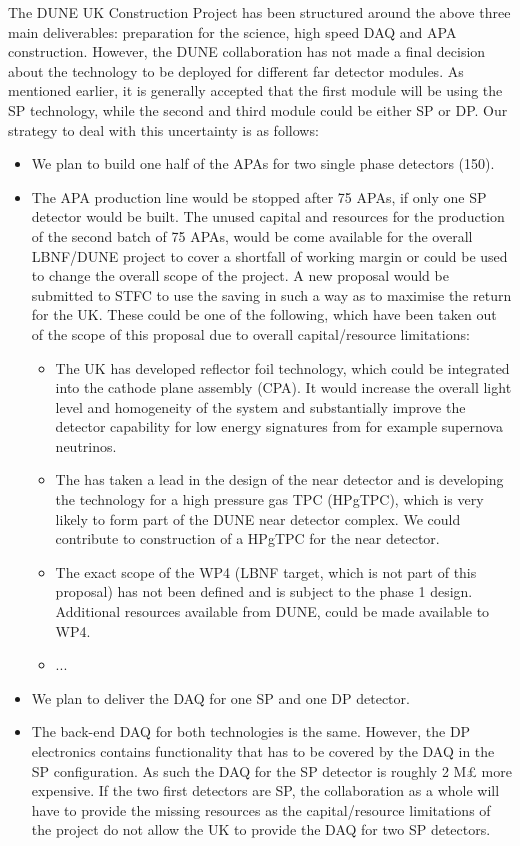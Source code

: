 The DUNE UK Construction Project has been structured around the above three main deliverables: preparation for the science, high speed DAQ and APA construction. However, the DUNE collaboration has not made a final decision about the technology to be deployed for different far detector modules. As mentioned earlier, it is generally accepted that the first module will be using the SP technology, while the second and third module could be either SP or DP. Our strategy to deal with this uncertainty is as follows:
\begin{itemize}
    \item We plan to build one half of the APAs for two single phase detectors (150). 
    \item The APA production line would be stopped after 75 APAs, if only one SP detector would be built. The unused capital and resources for the production of the second batch of 75 APAs,
    would be come available for the overall LBNF/DUNE project to cover a shortfall of working margin or could be used to change the overall scope of the project. A new proposal would be submitted to STFC to use the saving in such a way as to maximise the return for the UK. These could be one of the following, which have been taken out of the scope of this proposal due to overall capital/resource limitations:
    \begin{itemize}
        \item The UK has developed reflector foil technology, which could be integrated into the cathode plane assembly (CPA). It would increase the overall light level and homogeneity of the system and substantially improve the detector capability for low energy signatures from for example supernova neutrinos.
        \item The has taken a lead in the design of the near detector and is developing the technology for a high pressure gas TPC (HPgTPC), which is very likely to form part of the DUNE near detector complex. We could contribute to construction of a HPgTPC for the near detector.
        \item The exact scope of the WP4 (LBNF target, which is not part of this proposal) has not been defined and is subject to the phase 1 design. Additional resources available from DUNE, could be made available to WP4.
        \item ...
    \end{itemize}
    \item We plan to deliver the DAQ for one SP and one DP detector. 
    \item The back-end DAQ for both technologies is the same. However, the DP electronics contains functionality that has to be covered by the DAQ in the SP configuration. As such the DAQ for the SP detector is roughly 2 M£  more expensive. If the two first detectors are SP, the collaboration as a whole will have to provide the missing resources as the capital/resource limitations of the project do not allow the UK to provide the DAQ for two SP detectors.
\end{itemize}

